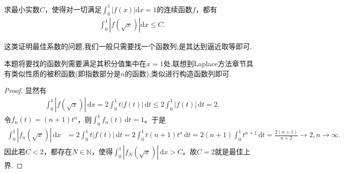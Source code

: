 \documentclass[../../main.tex]{subfiles}
\begin{document}
\begin{example}
求最小实数$C$，使得对一切满足$\int_{0}^{1}|f(x)|\mathrm{d}x = 1$的连续函数$f$，都有
\begin{align*}
\int_{0}^{1}|f(\sqrt{x})|\mathrm{d}x \leqslant C.
\end{align*}
\end{example}
\begin{remark}
这类证明最佳系数的问题,我们一般只需要找一个函数列,是其达到逼近取等即可.

本题将要找的函数列需要满足其积分值集中在$x=1$处,联想到Laplace方法章节具有类似性质的被积函数(即指数部分是$n$的函数),类似进行构造函数列即可.
\end{remark}
\begin{proof}
显然有
\begin{align*}
\int_0^1 |f(\sqrt{x})| \, \mathrm{d}x = 2 \int_0^1 t |f(t)| \, \mathrm{d}t \leqslant 2 \int_0^1 |f(t)| \, \mathrm{d}t = 2.
\end{align*}
令$f_n(t) = (n+1) t^n$，则$\int_0^1 f_n(t) \, \mathrm{d}t = 1$。于是
\begin{align*}
\int_0^1 |f_n(\sqrt{x})| \, \mathrm{d}x &= 2 \int_0^1 t |f(t)| \, \mathrm{d}t = 2 \int_0^1 t (n+1) t^n \, \mathrm{d}t 
= 2 (n+1) \int_0^1 t^{n+1} \, \mathrm{d}t = \frac{2(n+1)}{n+2} \to 2, n \to \infty.
\end{align*}
因此若$C < 2$，都存在$N \in \mathbb{N}$，使得$\int_0^1 |f_N(\sqrt{x})| \, \mathrm{d}x > C$。故$C = 2$就是最佳上界.

\end{proof}
\end{document}
